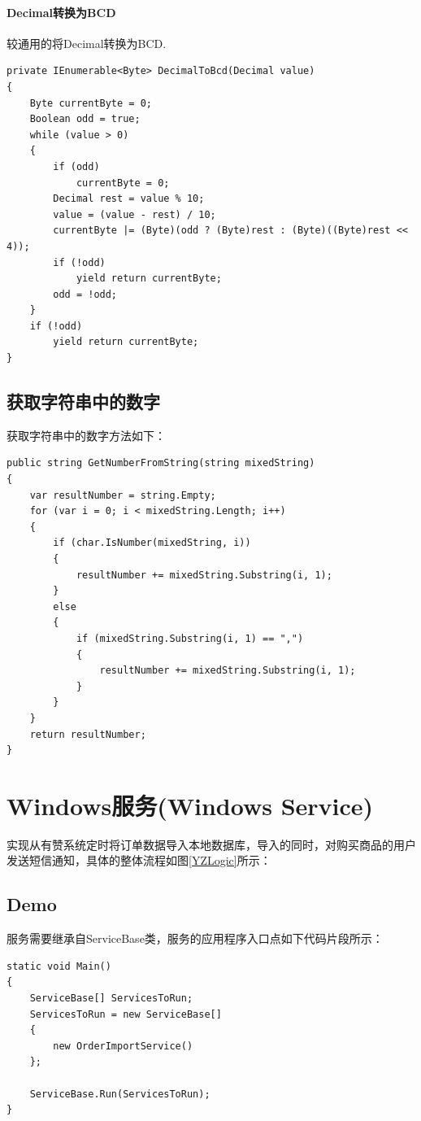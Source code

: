 \documentclass{book}
\begin{document}
\paragraph{Decimal转换为BCD}

较通用的将Decimal转换为BCD.

\begin{lstlisting}[language={[Sharp]C}]
private IEnumerable<Byte> DecimalToBcd(Decimal value)
{
	Byte currentByte = 0;
	Boolean odd = true;
	while (value > 0)
	{
		if (odd)
			currentByte = 0;
		Decimal rest = value % 10;
		value = (value - rest) / 10;
		currentByte |= (Byte)(odd ? (Byte)rest : (Byte)((Byte)rest << 4));
		if (!odd)
			yield return currentByte;
		odd = !odd;
	}
	if (!odd)
		yield return currentByte;
}  
\end{lstlisting}


\subsection{获取字符串中的数字}

获取字符串中的数字方法如下：

\begin{lstlisting}[language={[Sharp]C}]
public string GetNumberFromString(string mixedString)
{
	var resultNumber = string.Empty;
	for (var i = 0; i < mixedString.Length; i++)
	{
		if (char.IsNumber(mixedString, i))
		{
			resultNumber += mixedString.Substring(i, 1);
		}
		else
		{
			if (mixedString.Substring(i, 1) == ",")
			{
				resultNumber += mixedString.Substring(i, 1);
			}
		}
	}
	return resultNumber;
}
\end{lstlisting}


\section{Windows服务(Windows Service)}

实现从有赞系统定时将订单数据导入本地数据库，导入的同时，对购买商品的用户
发送短信通知，具体的整体流程如图\ref{YZLogic}所示：

\subsection{Demo}

服务需要继承自ServiceBase类，服务的应用程序入口点如下代码片段所示：

\begin{lstlisting}[language={[Sharp]C}]
static void Main()
{
    ServiceBase[] ServicesToRun;
    ServicesToRun = new ServiceBase[] 
	{ 
		new OrderImportService()             
	};

    ServiceBase.Run(ServicesToRun);
}
\end{lstlisting}
\end{document}
